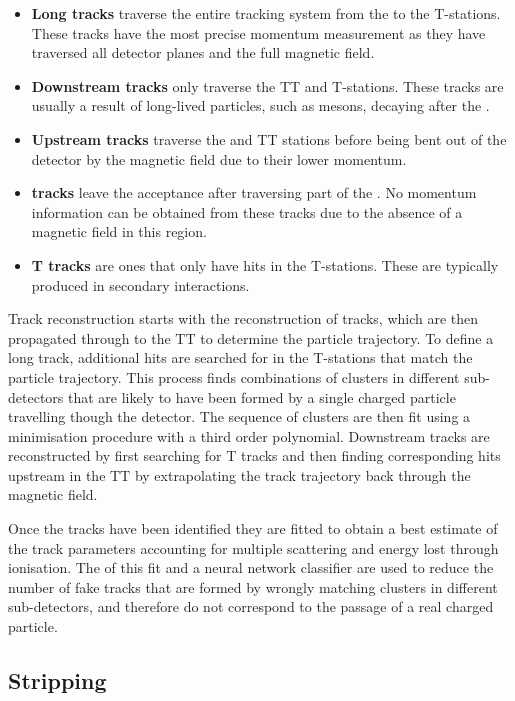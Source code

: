 \begin{itemize}
\item \textbf{Long tracks} traverse the entire tracking system from the \velo to the T-stations. These tracks have the most precise momentum measurement as they have traversed all detector planes and the full magnetic field.
\item \textbf{Downstream tracks} only traverse the TT and T-stations. These tracks are usually a result of long-lived particles, such as \KS mesons, decaying after the \velo.
\item \textbf{Upstream tracks} traverse the \velo and TT stations before being bent out of the detector by the magnetic field due to their lower momentum.
\item \textbf{\velo tracks} leave the \lhcb acceptance after traversing part of the \velo. No momentum information can be obtained from these tracks due to the absence of a magnetic field in this region.
\item \textbf{T tracks} are ones that only have hits in the T-stations. These are typically produced in secondary interactions.
\end{itemize}

Track reconstruction starts with the reconstruction of \velo tracks, which are then propagated through to the TT to determine the particle trajectory. To define a long track, additional hits are searched for in the T-stations that match the particle trajectory. This process finds combinations of clusters in different sub-detectors that are likely to have been formed by a single charged particle travelling though the detector. The sequence of clusters are then fit using a \chisq minimisation procedure with a third order polynomial. Downstream tracks are reconstructed by first searching for T tracks and then finding corresponding hits upstream in the TT by extrapolating the track trajectory back through the magnetic field.

Once the tracks have been identified they are fitted to obtain a best estimate of the track parameters accounting for multiple scattering and energy lost through ionisation. The \chisq of this fit and a neural network classifier are used to reduce the number of fake tracks that are formed by wrongly matching clusters in different sub-detectors, and therefore do not correspond to the passage of a real charged particle.

\subsection{Stripping}
\label{sec:detector:stripping}

